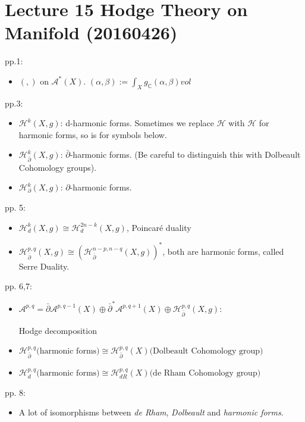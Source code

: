 \documentclass{book}
\numberwithin{equation}{subsection} %
\theoremstyle{definition}
\begin{document}
\section{Lecture 15 Hodge Theory on Manifold (20160426)}
pp.1:
\begin{itemize}
    \item $(,)$ on $\mathcal{A}^*(X)$. $(\alpha,\beta):=\int_X g_\mathbb{C}(\alpha,\beta) vol$
\end{itemize}
pp.3:
\begin{itemize}
    \item $\mathcal{H}^k(X,g)$: d-harmonic forms. Sometimes we replace $\mathcal{H}$ with $\mathscr{H}$ for harmonic forms, so is for symbols below.
    \item $\mathcal{H}^k_{\bar{\partial}}(X,g)$: $\bar{\partial}$-harmonic forms. 
    (Be careful to distinguish this with Dolbeault Cohomology groups).
    \item $\mathcal{H}^k_{\partial}(X,g)$: $\partial$-harmonic forms.
\end{itemize}
pp. 5:
\begin{itemize}
    \item $\mathcal{H}^k_d(X,g) \cong \mathcal{H}^{2n-k}_d(X,g)$, Poincar\'{e} duality
    \item $\mathcal{H}^{p,q}_{\bar{\partial}}(X,g) \cong 
    \left( \mathcal{H}^{n-p,n-q}_{\bar{\partial}}(X,g)\right)^*$, both are harmonic forms, called Serre Duality. 
\end{itemize}
pp. 6,7:
\begin{itemize}
    \item 
    $\mathcal{A}^{p,q} = 
    \bar{\partial}\mathcal{A}^{p,q-1}(X)\oplus
    \bar{\partial}^* \mathcal{A}^{p,q+1}(X) \oplus
    \mathcal{H}^{p,q}_{\bar{\partial}}(X,g)$:
    
     Hodge decomposition

    \item $\mathcal{H}^{p,q}_{\bar{\partial}}
        \text{(harmonic forms)}
        \cong
        \mathcal{H}^{p,q}_{\bar{\partial}}(X)
        \text{(Dolbeault Cohomology group)}$
    \item $\mathcal{H}^{p,q}_{d}
        \text{(harmonic forms)}
        \cong
        \mathcal{H}^{p,q}_{dR}(X)
        \text{(de Rham Cohomology group)}$
\end{itemize}
pp. 8:
\begin{itemize}
    \item A lot of isomorphisms between \textit{de Rham}, \textit{Dolbeault} and \textit{harmonic forms}.
\end{itemize}
\end{document}
